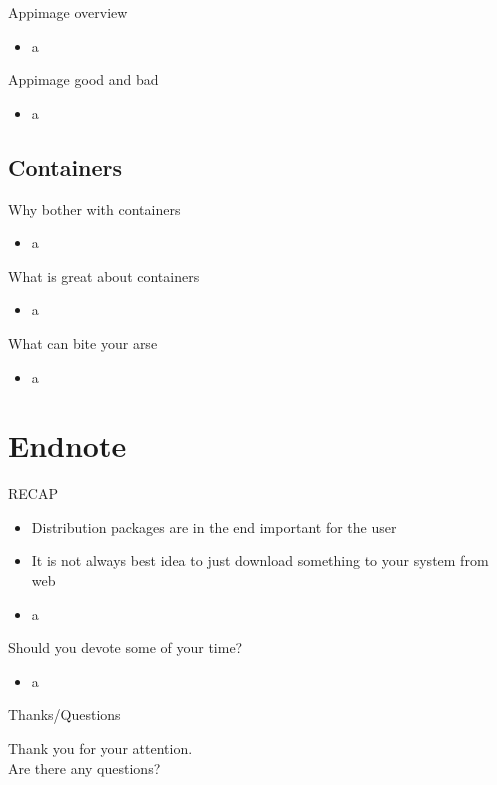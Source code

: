 \documentclass{beamer}
\begin{document}
\begin{frame}[t]{Appimage overview}
	\begin{itemize}
	\item a
	\end{itemize}
\end{frame}

\begin{frame}[t]{Appimage good and bad}
	\begin{itemize}
	\item a
	\end{itemize}
\end{frame}

\subsection{Containers}

\begin{frame}[t]{Why bother with containers}
	\begin{itemize}
	\item a
	\end{itemize}
\end{frame}

\begin{frame}[t]{What is great about containers}
	\begin{itemize}
	\item a
	\end{itemize}
\end{frame}

\begin{frame}[t]{What can bite your arse}
	\begin{itemize}
	\item a
	\end{itemize}
\end{frame}

\section{Endnote}

\begin{frame}[t]{RECAP}
	\begin{itemize}
	\item Distribution packages are in the end important for the user
	\item It is not always best idea to just download something to your system from web
	\item a
	\end{itemize}
\end{frame}

\begin{frame}[t]{Should you devote some of your time?}
	\begin{itemize}
	\item a
	\end{itemize}
\end{frame}

\begin{frame}{Thanks/Questions}
	\begin{center}
	Thank you for your attention.\\
	Are there any questions?
	\end{center}
\end{frame}
\end{document}
